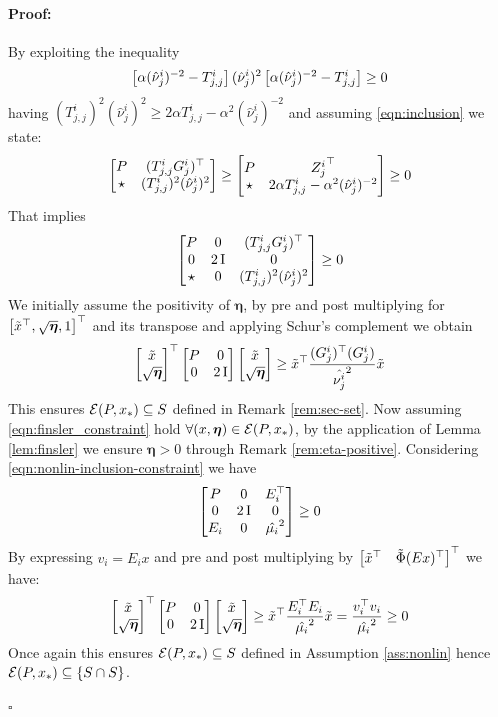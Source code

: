 \documentclass{ifacconf}
\theoremstyle{plain}
\newenvironment{proof}{\paragraph*{Proof:}}{\hfill$\square$}
\begin{document}
\begin{proof}
By exploiting the inequality $$\left[\begin{matrix}\alpha (\hat{\nu}^i_j)^{-2} - T^i_{j, j}\end{matrix}\right](\hat{\nu}^i_j)^2\left[\begin{matrix}\alpha (\hat{\nu}^i_j)^{-2} - T^i_{j, j}\end{matrix}\right] \geq 0$$ having $(T^i_{j,j})^2(\hat{\nu}^i_j)^2 \geq 2 \alpha T^i_{j,j} - \alpha^2 (\hat{\nu}_j^i)^{-2}$ and assuming \eqref{eqn:inclusion} we state:
$$
\left[\begin{matrix}
P & (T^i_{j,j} G^i_j)^\top\\
\star & (T^i_{j,j})^2(\hat{\nu}^i_j)^2
\end{matrix}\right] \geq 
\left[\begin{matrix}
P & {Z_j^i}^\top\\
\star & 2 \alpha T^i_{j,j} - \alpha^2 (\hat{\nu}_j^i)^{-2}
\end{matrix}\right] \geq 0
$$
That implies
$$
\left[\begin{matrix}
P & 0 & (T^i_{j,j} G^i_j)^\top\\
0 & 2 \operatorname{I} & 0\\
\star & 0 &(T^i_{j,j})^2(\hat{\nu}^i_j)^2
\end{matrix}\right] \geq 0
$$
We initially assume the positivity of $\boldsymbol{\eta}$, by pre and post multiplying for $\left[\begin{matrix}\tilde{x}^\top, \sqrt{\boldsymbol{\eta}}, 1\end{matrix}\right]^\top$ and its transpose and applying Schur's complement we obtain
$$
\left[\begin{matrix}\tilde{x}\\ \sqrt{\boldsymbol{\eta}}\end{matrix}\right]^\top \left[\begin{matrix}P & 0\\ 0 & 2 \operatorname{I}\end{matrix}\right] \left[\begin{matrix}\tilde{x}\\ \sqrt{\boldsymbol{\eta}}\end{matrix}\right] \geq \tilde{x}^\top \frac{(G^i_j)^\top (G^i_j)}{\hat{\nu^i_j}^2} \tilde{x}
$$
This ensures ${\mathcal{E}}(P, x_*) \subseteq S$ defined in Remark \ref{rem:sec-set}. Now assuming \eqref{eqn:finsler_constraint} hold $\forall (x, \boldsymbol{\eta}) \in {\mathcal{E}}(P, x_*)$, by the application of Lemma \ref{lem:finsler} we ensure $\boldsymbol{\eta} > 0$ through Remark \ref{rem:eta-positive}. Considering \eqref{eqn:nonlin-inclusion-constraint} we have
$$
\left[\begin{matrix}P & 0 & E_i^\top \\
0 & 2 \operatorname{I} & 0 \\
E_i & 0 & \hat{\mu_i}^2\end{matrix}\right] \geq 0
$$
By expressing $v_i = E_i x$ and pre and post multiplying by $\left[\begin{matrix}\tilde{x}^\top & \tilde{\Phi}(Ex)^\top\end{matrix}\right]^\top$ we have:
$$
\left[\begin{matrix}\tilde{x}\\ \sqrt{\boldsymbol{\eta}}\end{matrix}\right]^\top \left[\begin{matrix}P & 0\\ 0 & 2 \operatorname{I}\end{matrix}\right] \left[\begin{matrix}\tilde{x}\\ \sqrt{\boldsymbol{\eta}}\end{matrix}\right] \geq \tilde{x}^\top \frac{E_i^\top E_i}{\hat{\mu_i}^2} \tilde{x} = \frac{v_i^\top v_i}{\hat{\mu_i}^2} \geq 0
$$
Once again this ensures ${\mathcal{E}}(P, x_*) \subseteq \relax{S}$ defined in Assumption \ref{ass:nonlin} hence ${\mathcal{E}}(P, x_*) \subseteq \left\{ S \cap \relax{S} \right\}$.


\end{proof}
\end{document}
